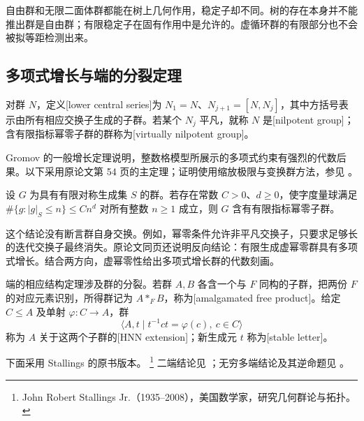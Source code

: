 自由群和无限二面体群都能在树上几何作用，稳定子却不同。树的存在本身并不能推出群是自由群；有限稳定子在固有作用中是允许的。虚循环群的有限部分也不会被拟等距检测出来。

\subsection{多项式增长与端的分裂定理}
\label{g3:subsec:D02:06}

对群 \(N\)，定义[lower central series]为 \(N_1=N\)、\(N_{j+1}=[N,N_j]\)，其中方括号表示由所有相应交换子生成的子群。若某个 \(N_j\) 平凡，就称 \(N\) 是[nilpotent group]；含有限指标幂零子群的群称为[virtually nilpotent group]。

\ProseParagraphBreak

Gromov 的一般增长定理说明，整数格模型所展示的多项式约束有强烈的代数后果。以下采用原论文第 54 页的主定理；证明使用缩放极限与变换群方法，参见 \cite[第 54 页及第 8 节]{Gromov1981PolynomialGrowth}。

\begin{theorem}\label{g3:thm:D-gromov-growth}
	设 \(G\) 为具有有限对称生成集 \(S\) 的群。若存在常数 \(C>0\)、\(d\ge0\)，使字度量球满足 \(\#\{g:|g|_S\le n\}\le Cn^d\) 对所有整数 \(n\ge1\) 成立，则 \(G\) 含有有限指标幂零子群。
\end{theorem}

这个结论没有断言群自身交换。例如，幂零条件允许非平凡交换子，只要求足够长的迭代交换子最终消失。原论文同页还说明反向结论：有限生成虚幂零群具有多项式增长。结合两方向，虚幂零性给出多项式增长群的代数刻画。

\ProseParagraphBreak

端的相应结构定理涉及群的分裂。若群 \(A,B\) 各含一个与 \(F\) 同构的子群，把两份 \(F\) 的对应元素识别，所得群记为 \(A*_F B\)，称为[amalgamated free product]。给定 \(C\le A\) 及单射 \(\varphi:C\rightarrow A\)，群
\[
	\langle A,t\mid t^{-1}ct=\varphi(c),\ c\in C\rangle
\]
称为 \(A\) 关于这两个子群的[HNN extension]；新生成元 \(t\) 称为[stable letter]。

\ProseParagraphBreak

下面采用 Stallings 的原书版本。%
\footnote{John Robert Stallings Jr.（1935--2008），美国数学家，研究几何群论与拓扑。}
二端结论见 \cite[4.A.6.5，第 38、45 页]{Stallings1971GroupTheory}；无穷多端结论及其逆命题见 \cite[5.A.9--5.A.10，第 57 页]{Stallings1971GroupTheory}。

